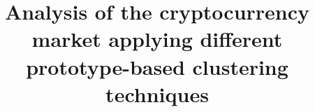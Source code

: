 \documentclass{bmcart}
\begin{document}
\begin{frontmatter}

\begin{fmbox}


\title{Analysis of the cryptocurrency market applying different prototype-based clustering techniques}


\author[
   addressref={aff1},                   %
   corref={aff1},                       %
   noteref={n1},                        %
   email={luislore@ucm.es}   %
]{ }
\author[
   addressref={aff1,aff2},
   email={javier.arroyo@fdi.ucm.es}
]{ }


\address[id=aff1]{%
  , %
  ,                     %
  ,                              %
}
\address[id=aff2]{%
  ,
  ,
  ,
}


\end{fmbox}
\end{frontmatter}
\end{document}
